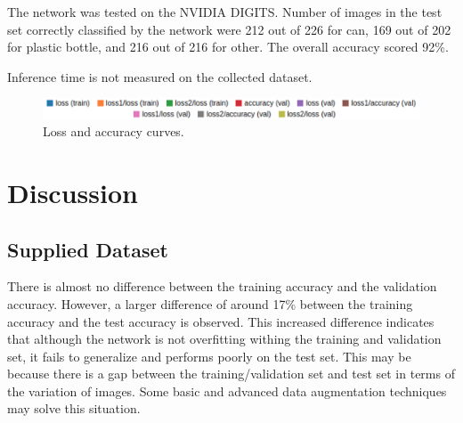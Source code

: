\documentclass[10pt,journal,compsoc]{IEEEtran}
\begin{document}
The network was tested on the NVIDIA DIGITS. Number of images in the test set  correctly classified by the network were 212 out of 226 for can, 169 out of 202 for plastic bottle, and 216 out of 216 for other. The overall accuracy scored 92\%.

Inference time is not measured on the collected dataset. 

\begin{figure}[thpb]
      \centering
      \vfill
      \vspace{0.5cm}
      \includegraphics[width=\linewidth]{loss-accuracy-curve-legend}
      \caption{Loss and accuracy curves.}
\end{figure}

\section{Discussion}
\subsection{Supplied Dataset}
There is almost no difference between the training accuracy and the validation accuracy. However, a larger difference of around 17\% between the training accuracy and the test accuracy is observed. This increased difference indicates that although the network is not overfitting withing the training and validation set, it fails to generalize and performs poorly on the test set. This may be because there is a gap between the training/validation set and test set in terms of the variation of images. Some basic and advanced data augmentation techniques \cite{DBLP:report/Jason16} may solve this situation.
\end{document}
